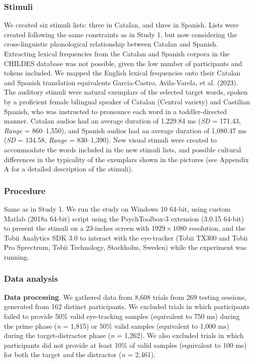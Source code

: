 \documentclass[
  12pt,
  b5paperpaper,
  twoside]{scrreprt}
\begin{document}
\hypertarget{stimuli-1}{%
\subsubsection{Stimuli}\label{stimuli-1}}

We created six stimuli lists: three in Catalan, and three in Spanish.
Lists were created following the same constraints as in Study 1, but now
considering the cross-linguistic phonological relationship between
Catalan and Spanish. Extracting lexical frequencies from the Catalan and
Spanish corpora in the CHILDES database was not possible, given the low
number of participants and tokens included. We mapped the English
lexical frequencies onto their Catalan and Spanish translation
equivalents Garcia-Castro, Avila-Varela, et al. (2023). The auditory
stimuli were natural exemplars of the selected target words, spoken by a
proficient female bilingual speaker of Catalan (Central variety) and
Castilian Spanish, who was instructed to pronounce each word in a
toddler-directed manner. Catalan audios had an average duration of
1,229.84 ms (\emph{SD} = 171.43, \emph{Range} = 860--1,550), and Spanish
audios had an average duration of 1,080.47 ms (\emph{SD} = 134.58,
\emph{Range} = 830--1,390). New visual stimuli were created to
accommodate the words included in the new stimuli lists, and possible
cultural differences in the typicality of the exemplars shown in the
pictures (see Appendix A for a detailed description of the stimuli).

\hypertarget{procedure-1}{%
\subsubsection{Procedure}\label{procedure-1}}

Same as in Study 1. We run the study on Windows 10 64-bit, using custom
Matlab (2018a 64-bit) script using the PsychToolbox-3 extension (3.0.15
64-bit) to present the stimuli on a 23-inches screen with
\(1929\times1080\) resolution, and the Tobii Analytics SDK 3.0 to
interact with the eye-tracker (Tobii TX300 and Tobii Pro Sprectrum,
Tobii Technology, Stockholm, Sweden) while the experiment was running.

\hypertarget{data-analysis-1}{%
\subsubsection{Data analysis}\label{data-analysis-1}}

\textbf{Data processing}. We gathered data from 8,608 trials from 269
testing sessions, generated from 162 distinct participants. We excluded
trials in which participants failed to provide 50\% valid eye-tracking
samples (equivalent to 750 ms) during the prime phase (\emph{n} = 1,815)
or 50\% valid samples (equivalent to 1,000 ms) during the
target-distractor phase (\emph{n} = 1,262). We also excluded trials in
which participants did not provide at least 10\% of valid samples
(equivalent to 100 ms) for both the target \emph{and} the distractor
(\emph{n} = 2,461).
\end{document}
